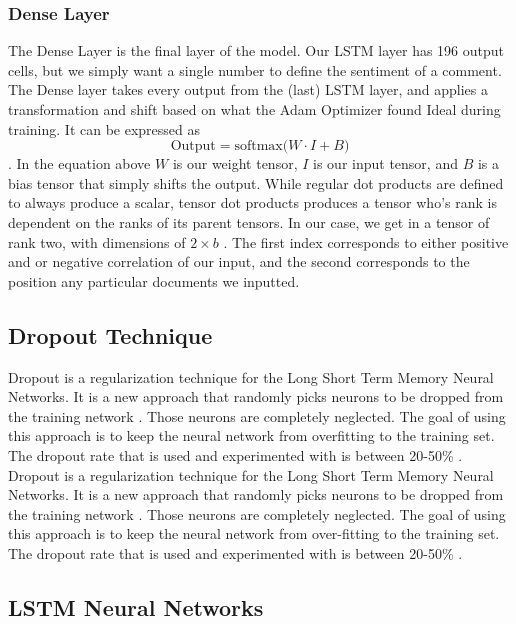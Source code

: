 \documentclass[titlepage,letterpaper]{article}
\begin{document}
\subsubsection{Dense Layer}
The Dense Layer is the final layer of the model. Our LSTM layer has 196 output cells, but we simply want a single number to define the sentiment of a comment.  The Dense layer takes every output from the (last) LSTM layer, and applies a transformation and shift based on what the Adam Optimizer found Ideal during training. It can be expressed as
\[ \text{Output} = \text{softmax(} W \cdot I + B ) \].
In the equation above \(W\) is our weight tensor, \(I\) is our input tensor, and \(B\) is a bias tensor that simply shifts the output. While regular dot products are defined to always produce a scalar, tensor dot products produces a tensor who's rank is dependent on the ranks of its parent tensors. In our case, we get in a tensor of rank two, with dimensions of \(2\times b\) . The first index corresponds to either positive and or negative correlation of our input, and the second corresponds to the position any particular documents we inputted. \cite{tensors, tensorflow}





\subsection{Dropout Technique}
Dropout is a regularization technique for the Long Short Term Memory Neural Networks. It is a new approach that randomly picks neurons to be dropped from the training network \cite{NeuralNet}. Those neurons are completely neglected. The goal of using this approach is to keep the neural network from overfitting to the training set. The dropout rate that is used and experimented with is between 20-50\% \cite{NeuralNet}.
Dropout is a regularization technique for the Long Short Term Memory Neural Networks. It is a new approach that randomly picks neurons to be dropped from the training network \cite{NeuralNet}. Those neurons are completely neglected. The goal of using this approach is to keep the neural network from over-fitting to the training set. The dropout rate that is used and experimented with is between 20-50\% \cite{NeuralNet}.

\subsection{LSTM Neural Networks} \label{lstm_sec}
\end{document}
